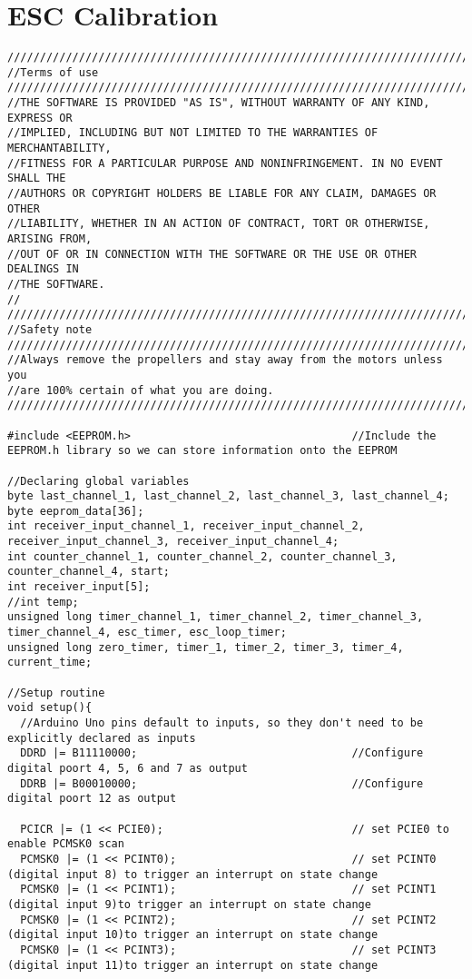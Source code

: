 \section{ESC Calibration}

\begin{lstlisting}
///////////////////////////////////////////////////////////////////////////////////////
//Terms of use
///////////////////////////////////////////////////////////////////////////////////////
//THE SOFTWARE IS PROVIDED "AS IS", WITHOUT WARRANTY OF ANY KIND, EXPRESS OR
//IMPLIED, INCLUDING BUT NOT LIMITED TO THE WARRANTIES OF MERCHANTABILITY,
//FITNESS FOR A PARTICULAR PURPOSE AND NONINFRINGEMENT. IN NO EVENT SHALL THE
//AUTHORS OR COPYRIGHT HOLDERS BE LIABLE FOR ANY CLAIM, DAMAGES OR OTHER
//LIABILITY, WHETHER IN AN ACTION OF CONTRACT, TORT OR OTHERWISE, ARISING FROM,
//OUT OF OR IN CONNECTION WITH THE SOFTWARE OR THE USE OR OTHER DEALINGS IN
//THE SOFTWARE.
//
///////////////////////////////////////////////////////////////////////////////////////
//Safety note
///////////////////////////////////////////////////////////////////////////////////////
//Always remove the propellers and stay away from the motors unless you 
//are 100% certain of what you are doing.
///////////////////////////////////////////////////////////////////////////////////////

#include <EEPROM.h>                                  //Include the EEPROM.h library so we can store information onto the EEPROM

//Declaring global variables
byte last_channel_1, last_channel_2, last_channel_3, last_channel_4;
byte eeprom_data[36];
int receiver_input_channel_1, receiver_input_channel_2, receiver_input_channel_3, receiver_input_channel_4;
int counter_channel_1, counter_channel_2, counter_channel_3, counter_channel_4, start;
int receiver_input[5];
//int temp;
unsigned long timer_channel_1, timer_channel_2, timer_channel_3, timer_channel_4, esc_timer, esc_loop_timer;
unsigned long zero_timer, timer_1, timer_2, timer_3, timer_4, current_time;

//Setup routine
void setup(){  
  //Arduino Uno pins default to inputs, so they don't need to be explicitly declared as inputs
  DDRD |= B11110000;                                 //Configure digital poort 4, 5, 6 and 7 as output
  DDRB |= B00010000;                                 //Configure digital poort 12 as output
  
  PCICR |= (1 << PCIE0);                             // set PCIE0 to enable PCMSK0 scan
  PCMSK0 |= (1 << PCINT0);                           // set PCINT0 (digital input 8) to trigger an interrupt on state change
  PCMSK0 |= (1 << PCINT1);                           // set PCINT1 (digital input 9)to trigger an interrupt on state change
  PCMSK0 |= (1 << PCINT2);                           // set PCINT2 (digital input 10)to trigger an interrupt on state change
  PCMSK0 |= (1 << PCINT3);                           // set PCINT3 (digital input 11)to trigger an interrupt on state change
  

\end{lstlisting}
